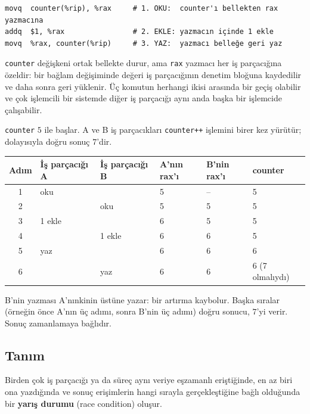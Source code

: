 \begin{lstlisting}[style=term]
movq  counter(%rip), %rax     # 1. OKU:  counter'ı bellekten rax yazmacına
addq  $1, %rax                # 2. EKLE: yazmacın içinde 1 ekle
movq  %rax, counter(%rip)     # 3. YAZ:  yazmacı belleğe geri yaz
\end{lstlisting}

\texttt{counter} değişkeni ortak bellekte durur, ama \texttt{rax} yazmacı her iş parçacığına özeldir: bir bağlam değişiminde değeri iş parçacığının denetim bloğuna kaydedilir ve daha sonra geri yüklenir. Üç komutun herhangi ikisi arasında bir geçiş olabilir ve çok işlemcili bir sistemde diğer iş parçacığı aynı anda başka bir işlemcide çalışabilir.

\begin{example}
\texttt{counter} $5$ ile başlar. A ve B iş parçacıkları \texttt{counter++} işlemini birer kez yürütür; dolayısıyla doğru sonuç $7$'dir.
\begin{center}
\renewcommand{\arraystretch}{1.15}
\begin{tabular}{@{}clllll@{}}
\toprule
\textbf{Adım} & \textbf{İş parçacığı A} & \textbf{İş parçacığı B} & \textbf{A'nın rax'ı} & \textbf{B'nin rax'ı} & \textbf{counter}\\
\midrule
1 & oku & & 5 & -- & 5\\
2 & & oku & 5 & 5 & 5\\
3 & 1 ekle & & 6 & 5 & 5\\
4 & & 1 ekle & 6 & 6 & 5\\
5 & yaz & & 6 & 6 & 6\\
6 & & yaz & 6 & 6 & 6 (7 olmalıydı)\\
\bottomrule
\end{tabular}
\end{center}
B'nin yazması A'nınkinin üstüne yazar: bir artırma kaybolur. Başka sıralar (örneğin önce A'nın üç adımı, sonra B'nin üç adımı) doğru sonucu, $7$'yi verir. Sonuç zamanlamaya bağlıdır.
\end{example}

\subsection{Tanım}

\begin{keyidea}
Birden çok iş parçacığı ya da süreç aynı veriye eşzamanlı eriştiğinde, en az biri ona yazdığında ve sonuç erişimlerin hangi sırayla gerçekleştiğine bağlı olduğunda bir \textbf{yarış durumu} (race condition) oluşur.
\end{keyidea}

